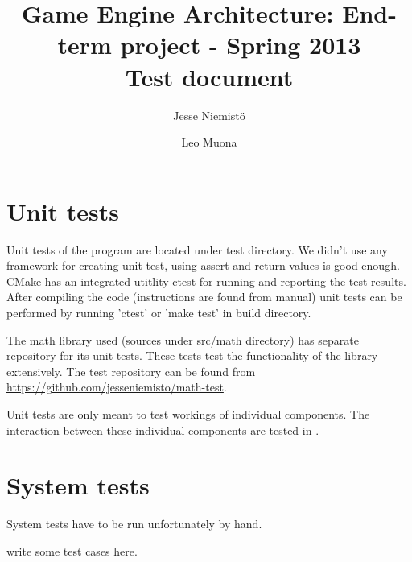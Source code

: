 \documentclass[11pt,twoside,a4paper]{article}
\begin{document}
\author{Jesse Niemistö \and Leo Muona}
\title{Game Engine Architecture: End-term project - Spring 2013 \\
       Test document}

\maketitle

\section{Unit tests}
\label{sec:unit_tests}

Unit tests of the program are located under test directory. We didn't use any framework for creating unit test, using assert and return values is good enough. CMake has an integrated utitlity ctest for running and reporting the test results. After compiling the code (instructions are found from manual) unit tests can be performed by running 'ctest' or 'make test' in build directory.

The math library used (sources under src/math directory) has separate repository for its unit tests. These tests test the functionality of the library extensively. The test repository can be found from \url{https://github.com/jesseniemisto/math-test}.

Unit tests are only meant to test workings of individual components. The interaction between these individual components are tested in .

\section{System tests}
\label{sec:system_tests}

System tests have to be run unfortunately by hand.

write some test cases here.
\end{document}
